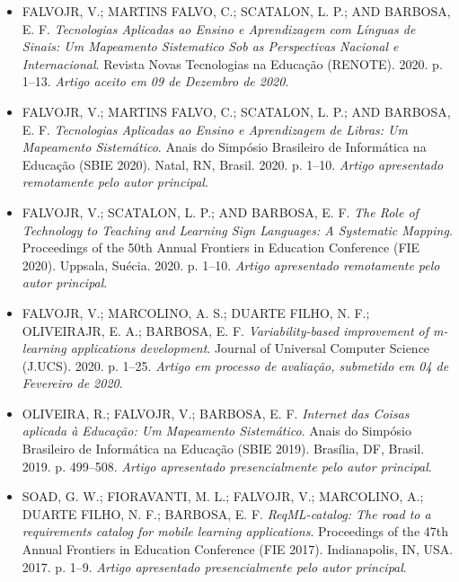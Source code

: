 \begin{itemize}

\item \uppercase{FalvoJr, V.; Martins Falvo, C.; Scatalon, L. P.; and Barbosa, E. F.} \textit{Tecnologias Aplicadas ao Ensino e Aprendizagem com Línguas de Sinais: Um Mapeamento Sistematico Sob as Perspectivas Nacional e Internacional}. Revista Novas Tecnologias na Educação (RENOTE). 2020. p. 1--13. \textit{Artigo aceito em 09 de Dezembro de 2020}.

\item \uppercase{FalvoJr, V.; Martins Falvo, C.; Scatalon, L. P.; and Barbosa, E. F.} \textit{Tecnologias Aplicadas ao Ensino e Aprendizagem de Libras: Um Mapeamento Sistemático}. Anais do Simpósio Brasileiro de Informática na Educação (SBIE 2020). Natal, RN, Brasil. 2020. p. 1--10. \textit{Artigo apresentado remotamente pelo autor principal}.

\item \uppercase{FalvoJr, V.; Scatalon, L. P.; and Barbosa, E. F.} \textit{The Role of Technology to Teaching and Learning Sign Languages: A Systematic Mapping}. Proceedings of the 50th Annual Frontiers in Education Conference (FIE 2020). Uppsala, Suécia. 2020. p. 1--10. \textit{Artigo apresentado remotamente pelo autor principal}.

\item \uppercase{FalvoJr, V.; Marcolino, A. S.; Duarte Filho, N. F.; OliveiraJr, E. A.; Barbosa, E. F.} \textit{Variability-based improvement of m-learning applications development}. Journal of Universal Computer Science (J.UCS). 2020. p. 1--25. \textit{Artigo em processo de avaliação, submetido em 04 de Fevereiro de 2020}.

\item \uppercase{Oliveira, R.; FalvoJr, V.; Barbosa, E. F.} \textit{Internet das Coisas aplicada à Educação: Um Mapeamento Sistemático}. Anais do Simpósio Brasileiro de Informática na Educação (SBIE 2019). Brasília, DF, Brasil. 2019. p. 499--508. \textit{Artigo apresentado presencialmente pelo autor principal}.

\item \uppercase{Soad, G. W.; Fioravanti, M. L.; FalvoJr, V.; Marcolino, A.; Duarte Filho, N. F.; Barbosa, E. F.} \textit{ReqML-catalog: The road to a requirements catalog for mobile learning applications}. Proceedings of the 47th Annual Frontiers in Education Conference (FIE 2017). Indianapolis, IN, USA. 2017. p. 1–9. \textit{Artigo apresentado presencialmente pelo autor principal}.

\end{itemize}